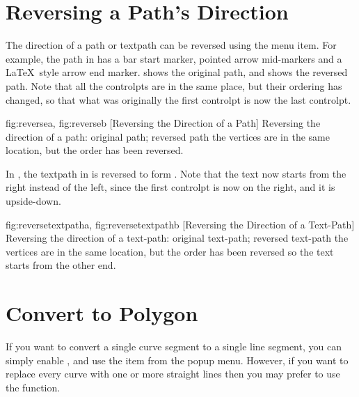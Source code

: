 
\section{Reversing a Path's Direction}\label{sec:reversing}


The direction of a \gls{path} or \gls{textpath} can be reversed
using the  menu item. For example, the path
in  has a bar start marker, pointed arrow
mid-markers and a \LaTeX\ style arrow end marker.
 shows the original path, and
 shows the reversed path. Note that all the
\glspl{controlpt} are in the same place, but their ordering has
changed, so that what was originally the first \gls{controlpt} is
now the last \gls{controlpt}.

{
  {fig:reversea}{}{},
  {fig:reverseb}{}{}
}
[Reversing the Direction of a Path]
{Reversing the direction of a path:
 original path;
 reversed path\dash
the vertices are in the same location, but the order has been
reversed.}

In , the \gls*{textpath} in
 is reversed to form 
. Note that the text now starts
from the right instead of the left, since the first \gls*{controlpt}
is now on the right, and it is upside-down.

{
  {fig:reversetextpatha}{}{},
  {fig:reversetextpathb}{}{}
}
[Reversing the Direction of a Text-Path]
{Reversing the direction of a text-path:
 original text-path;
 reversed text-path\dash 
the vertices are in the same location, but the order has been
reversed so the text starts from the other end.}

\section{Convert to Polygon}\label{sec:converttopolygon}

If you want to convert a single \gls{curve} segment to a single
line segment, you can simply enable \editpathmode, and use the 
 item from the popup menu.
However, if you want to replace every curve with one or more straight
lines then you may prefer to use the 
function.

